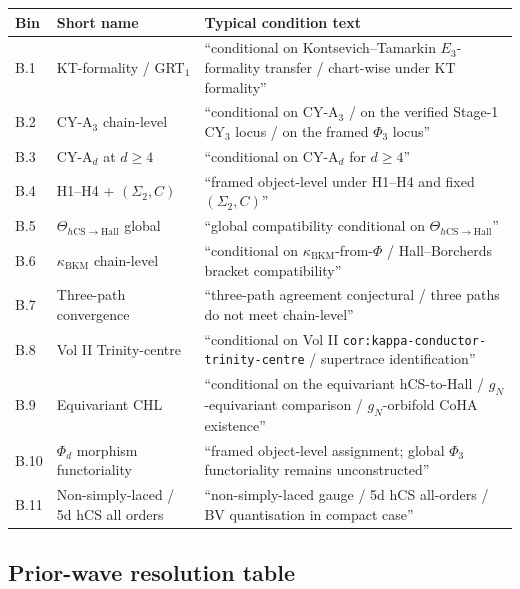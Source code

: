 \documentclass[11pt]{amsart}
\providecommand{\kBKM}{\kappa_{\mathrm{BKM}}}
\providecommand{\hCS}{h\mathrm{CS}}
\providecommand{\Hall}{\mathrm{Hall}}
\begin{document}
\begin{center}
\small
\begin{tabular}{@{}llp{6.5cm}@{}}
\toprule
Bin & Short name & Typical condition text \\
\midrule
B.1  & KT-formality / GRT$_1$ & ``conditional on Kontsevich--Tamarkin $E_3$-formality transfer / chart-wise under KT formality'' \\
B.2  & CY-A$_3$ chain-level  & ``conditional on CY-A$_3$ / on the verified Stage-1 CY$_3$ locus / on the framed $\Phi_3$ locus'' \\
B.3  & CY-A$_d$ at $d \geq 4$ & ``conditional on CY-A$_d$ for $d \geq 4$'' \\
B.4  & H1--H4 + $(\Sigma_2,C)$ & ``framed object-level under H1--H4 and fixed $(\Sigma_2, C)$'' \\
B.5  & $\Theta_{\hCS \to \Hall}$ global & ``global compatibility conditional on $\Theta_{\hCS \to \Hall}$'' \\
B.6  & $\kBKM$ chain-level  & ``conditional on $\kBKM$-from-$\Phi$ / Hall--Borcherds bracket compatibility'' \\
B.7  & Three-path convergence & ``three-path agreement conjectural / three paths do not meet chain-level'' \\
B.8  & Vol II Trinity-centre & ``conditional on Vol II \texttt{cor:kappa-conductor-trinity-centre} / supertrace identification'' \\
B.9  & Equivariant CHL        & ``conditional on the equivariant hCS-to-Hall / $g_N$-equivariant comparison / $g_N$-orbifold CoHA existence'' \\
B.10 & $\Phi_d$ morphism functoriality & ``framed object-level assignment; global $\Phi_3$ functoriality remains unconstructed'' \\
B.11 & Non-simply-laced / 5d hCS all orders & ``non-simply-laced gauge / 5d hCS all-orders / BV quantisation in compact case'' \\
\bottomrule
\end{tabular}
\end{center}

\subsection{Prior-wave resolution table}
\label{subsec:prior-wave-resolution}
\end{document}
